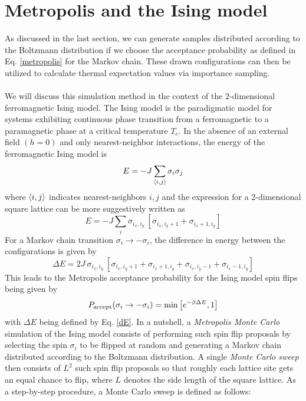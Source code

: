 \documentclass[../journal_main.tex]{subfiles}
\begin{document}
\section{Metropolis and the Ising model}
As discussed in the last section, we can generate samples distributed according to the Boltzmann distribution if we choose the acceptance probability as defined in Eq. \eqref{metropolis} for the Markov chain. These drawn configurations can then be utilized to calculate thermal expectation values via importance sampling.~\\~\\
We will discuss this simulation method in the context of the 2-dimensional ferromagnetic Ising model. The Ising model is the paradigmatic model for systems exhibiting continuous phase transition from a ferromagnetic to a paramagnetic phase at a critical temperature $T_c$. In the absence of an external field $(h=0)$ and only nearest-neighbor interactions, the energy of the ferromagnetic Ising model is 
\begin{equation}
    E = -J \sum_{\expval{i, j}} \sigma_i \sigma_j
    \label{ising}
\end{equation}
where $\expval{i, j}$ indicates nearest-neighbors $i, j$ and the expression for a 2-dimensional square lattice can be more suggestively written as 
\begin{equation}
    E  = -J \sum_{i} \sigma_{i_x, i_y}  \: [\sigma_{i_x, i_y + 1} + \sigma_{i_x + 1, i_y}]
\end{equation}   
For a Markov chain transition $\sigma_i \to - \sigma_i$, the difference in energy between the configurations is given by 
\begin{equation}
    \Delta E = 2J \: \sigma_{i_x, i_y} \: [\sigma_{i_x, i_y + 1} + \sigma_{i_x + 1, i_y} + \sigma_{i_x, i_y - 1} + \sigma_{i_x - 1 , i_y}]
    \label{dE}
\end{equation}
This leads to the Metropolis acceptance probability for the Ising model spin flips being given by
\begin{equation}
    P_\text{accept}(\sigma_i \to -\sigma_i) = \min \qty[e^{-\beta \Delta E}, 1]
    \label{metropolis_ising}
\end{equation}
with $\Delta E$ being defined by Eq. \eqref{dE}. In a nutshell, a \textit{Metropolis Monte Carlo} simulation of the Ising model consists of performing such spin flip proposals by selecting the spin $\sigma_i$ to be flipped at random and generating a Markov chain distributed according to the Boltzmann distribution. A single \textit{Monte Carlo sweep} then consists of $L^2$ such spin flip proposals so that roughly each lattice site gets an equal chance to flip, where $L$ denotes the side length of the square lattice. As a step-by-step procedure, a Monte Carlo sweep is defined as follows:
\end{document}
